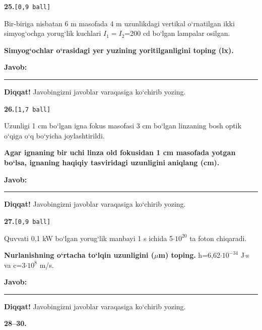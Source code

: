 \documentclass[11pt,a4paper]{article}
\newcommand{\ball}[1]{\hfill\texttt{[#1 ball]}}
\newcommand{\qhead}[2]{\Needspace{10\baselineskip}\noindent\textbf{#1.}\ball{#2}\par\nopagebreak}
\newenvironment{qbody}{\begin{list}{}{\leftmargin=8mm\rightmargin=0pt\topsep=0pt\itemsep=0pt\parsep=3pt}\item\relax}{\end{list}}
\begin{document}
\qhead{25}{0,9}
\begin{qbody}
Bir-biriga nisbatan 6 m masofada 4 m uzunlikdagi vertikal o‘rnatilgan ikki simyog‘ochga yorug‘lik kuchlari $I_1=I_2$=200 cd bo‘lgan lampalar osilgan.\par
\textbf{Simyog‘ochlar o‘rasidagi yer yuzining yoritilganligini toping (lx).}\par
\medskip\textbf{Javob:}\ \rule{5cm}{0.4pt}\par
\textbf{Diqqat!} Javobingizni javoblar varaqasiga ko‘chirib yozing.\par
\end{qbody}\vspace{18pt}
\qhead{26}{1,7}
\begin{qbody}
Uzunligi 1 cm bo‘lgan igna fokus masofasi 3 cm bo‘lgan linzaning bosh optik o‘qiga o‘q bo‘yicha joylashtirildi.\par
\textbf{Agar ignaning bir uchi linza old fokusidan 1 cm masofada yotgan bo‘lsa, ignaning haqiqiy tasviridagi uzunligini aniqlang (cm).}\par
\medskip\textbf{Javob:}\ \rule{5cm}{0.4pt}\par
\textbf{Diqqat!} Javobingizni javoblar varaqasiga ko‘chirib yozing.\par
\end{qbody}\vspace{18pt}
\qhead{27}{0,9}
\begin{qbody}
Quvvati 0,1 kW bo‘lgan yorug‘lik manbayi 1 s ichida 5$\cdot10^{20}$ ta foton chiqaradi.\par
\textbf{Nurlanishning o‘rtacha to‘lqin uzunligini ($\mu$m) toping.} h=6,62$\cdot10^{-34}$ J$\cdot$s va c=3$\cdot10^{8}$ m/s.\par
\medskip\textbf{Javob:}\ \rule{5cm}{0.4pt}\par
\textbf{Diqqat!} Javobingizni javoblar varaqasiga ko‘chirib yozing.\par
\end{qbody}\vspace{18pt}
\noindent\textbf{28--30.}\par
\end{document}
